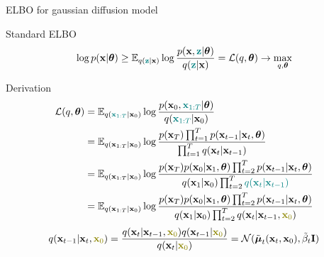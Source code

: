 \begin{frame}{ELBO for gaussian diffusion model}
	\begin{block}{Standard ELBO}
		\vspace{-0.4cm}
		\[
			\log p(\mathbf{x} | \boldsymbol{\theta}) \geq \mathbb{E}_{q({\color{teal}\mathbf{z}} | \mathbf{x})} \log \frac{p(\mathbf{x}, {\color{teal}\mathbf{z}} | \boldsymbol{\theta})}{q({\color{teal}\mathbf{z}} | \mathbf{x})} = \mathcal{L}(q, \boldsymbol{\theta}) \rightarrow \max_{q, \boldsymbol{\theta}}
		\]
		\vspace{-0.5cm}
	\end{block}
	\begin{block}{Derivation}
		\vspace{-0.5cm}
		{\small
		\begin{align*}
			\cL(q, \btheta) &= \bbE_{q({\color{teal}\bx_{1:T}} | \bx_0)} \log \frac{p(\bx_0, {\color{teal}\bx_{1:T}} | \btheta)}{q({\color{teal}\bx_{1:T}} | \bx_0)} \\
			& = \bbE_{q(\bx_{1:T} | \bx_0)} \log \frac{p(\bx_T) \prod_{t=1}^T p(\bx_{t-1} | \bx_t, \btheta) }{\prod_{t=1}^T q(\bx_t | \bx_{t-1})}  \\ 
			& = \bbE_{q(\bx_{1:T} | \bx_0)} \log \frac{p(\bx_T) p(\bx_0 | \bx_1, \btheta) \prod_{t=2}^T p(\bx_{t-1} | \bx_t, \btheta) }{q(\bx_1 | \bx_0)\prod_{t=2}^T {\color{teal}q(\bx_t | \bx_{t-1})}}  \\ 
			& = \bbE_{q(\bx_{1:T} | \bx_0)} \log \frac{p(\bx_T) p(\bx_0 | \bx_1, \btheta) \prod_{t=2}^T p(\bx_{t-1} | \bx_t, \btheta) }{q(\bx_1 | \bx_0)\prod_{t=2}^T q(\bx_t | \bx_{t-1}, {\color{olive}\bx_0})} 
		\end{align*}
		}
		\[
			q(\bx_{t-1}|\bx_{t}, {\color{olive}\bx_0}) = \frac{q(\bx_{t}|\bx_{t-1}, {\color{olive}\bx_0}) q(\bx_{t-1} | {\color{olive}\bx_0}) }{q(\bx_{t}| {\color{olive}\bx_0})} = \cN(\tilde{\bmu}_t(\bx_t, \bx_0), \tilde{\beta}_t \bI)
		\]
	\end{block}
	
\end{frame}
